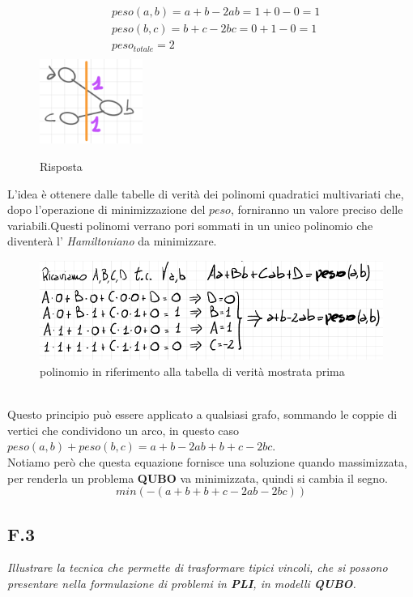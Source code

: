 \documentclass[a4paper]{article}
\begin{document}
\newpage
\begin{figure}[!ht]
                \centering
		\begin{align*}
                        & peso(a,b) = a + b -2ab = 1 + 0 - 0 = 1 \\
                        & peso(b,c) = b + c -2bc = 0 + 1 - 0 = 1 \\
                        & peso_{totale} = 2\\
                \end{align*}
                \includegraphics[width = 0.3\textwidth]{./img/F2_R.png}
                \caption{Risposta} \label{FIG:F2_true}
\end{figure}
L'idea è ottenere dalle tabelle di verità dei polinomi quadratici multivariati che, dopo l'operazione di minimizzazione del $peso$, forniranno un valore preciso delle variabili.Questi polinomi verrano pori sommati in un unico polinomio che diventerà l' \textit{Hamiltoniano} da minimizzare.
\begin{figure}[!ht]
                \centering
                \includegraphics[width = 1\textwidth]{./img/F2_EQ.png}
                \caption{polinomio in riferimento alla tabella di verità mostrata prima} \label{FIG:F2_EQ}
\end{figure}\\

Questo principio può essere applicato a qualsiasi grafo, sommando le coppie di vertici che condividono un arco, in questo caso $peso(a,b) + peso(b,c) = a +b -2ab +b +c -2bc$.\\
Notiamo però che questa equazione fornisce una soluzione quando massimizzata, per renderla un problema \textbf{QUBO} va minimizzata, quindi si cambia il segno.
$$ min(-(a + b + b + c - 2ab - 2 bc))$$
\newpage
\subsection{F.3}
\label{SEC:F3}
\emph{Illustrare la tecnica che permette di trasformare tipici vincoli, che si possono presentare nella formulazione di problemi in \textbf{PLI}, in modelli \textbf{QUBO}.}
\end{document}

